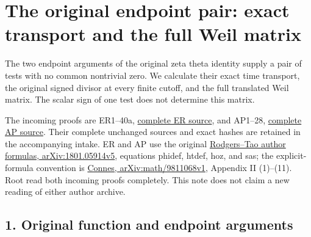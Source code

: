 \documentclass[
  10pt,
  a4paper,
]{article}
\author{}
\date{}
\begin{document}
{
\setcounter{tocdepth}{3}
\tableofcontents
}
\section{The original endpoint pair: exact transport and the full Weil
matrix}\label{the-original-endpoint-pair-exact-transport-and-the-full-weil-matrix}

The two endpoint arguments of the original zeta theta identity supply a
pair of tests with no common nontrivial zero. We calculate their exact
time transport, the original signed divisor at every finite cutoff, and
the full translated Weil matrix. The scalar sign of one test does not
determine this matrix.

The incoming proofs are ER1--40a,
\href{supporting_proofs/endpoint_resonance_20260923/ENDPOINT_RESONANCE_AND_PRIME_CLASS.tex}{complete
ER source}, and AP1--28,
\href{supporting_proofs/arithmetic_pairing_20260923/ACTUAL_ENDPOINT_PAIRING.tex}{complete
AP source}. Their complete unchanged sources and exact hashes are
retained in the accompanying intake. ER and AP use the original
\href{https://arxiv.org/abs/1801.05914v5}{Rodgers--Tao author formulas,
arXiv:1801.05914v5}, equations phidef, htdef, hoz, and sas; the
explicit-formula convention is
\href{https://arxiv.org/abs/math/9811068v1}{Connes,
arXiv:math/9811068v1}, Appendix II (1)--(11). Root read both incoming
proofs completely. This note does not claim a new reading of either
author archive.

\subsection{1. Original function and endpoint
arguments}\label{original-function-and-endpoint-arguments}
\end{document}
